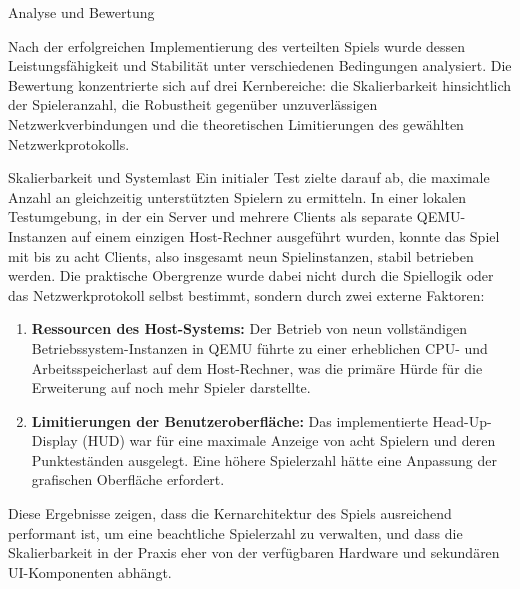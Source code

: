 \begin{section}{Analyse und Bewertung}

Nach der erfolgreichen Implementierung des verteilten Spiels wurde dessen Leistungsfähigkeit und Stabilität unter verschiedenen Bedingungen analysiert.
Die Bewertung konzentrierte sich auf drei Kernbereiche: die Skalierbarkeit hinsichtlich der Spieleranzahl, die Robustheit gegenüber unzuverlässigen Netzwerkverbindungen und die theoretischen Limitierungen des gewählten Netzwerkprotokolls.
\begin{subsection}{Skalierbarkeit und Systemlast}
Ein initialer Test zielte darauf ab, die maximale Anzahl an gleichzeitig unterstützten Spielern zu ermitteln.
In einer lokalen Testumgebung, in der ein Server und mehrere Clients als separate QEMU-Instanzen auf einem einzigen Host-Rechner ausgeführt wurden, konnte das Spiel mit bis zu acht Clients, also insgesamt neun Spielinstanzen, stabil betrieben werden.
Die praktische Obergrenze wurde dabei nicht durch die Spiellogik oder das Netzwerkprotokoll selbst bestimmt, sondern durch zwei externe Faktoren:
\begin{enumerate}
    \item \textbf{Ressourcen des Host-Systems:} Der Betrieb von neun vollständigen Betriebssystem-Instanzen in QEMU führte zu einer erheblichen CPU- und Arbeitsspeicherlast auf dem Host-Rechner, was die primäre Hürde für die Erweiterung auf noch mehr Spieler darstellte.
\item \textbf{Limitierungen der Benutzeroberfläche:} Das implementierte Head-Up-Display (HUD) war für eine maximale Anzeige von acht Spielern und deren Punkteständen ausgelegt.
Eine höhere Spielerzahl hätte eine Anpassung der grafischen Oberfläche erfordert.
\end{enumerate}
Diese Ergebnisse zeigen, dass die Kernarchitektur des Spiels ausreichend performant ist, um eine beachtliche Spielerzahl zu verwalten, und dass die Skalierbarkeit in der Praxis eher von der verfügbaren Hardware und sekundären UI-Komponenten abhängt.
\end{subsection}


\end{section}

